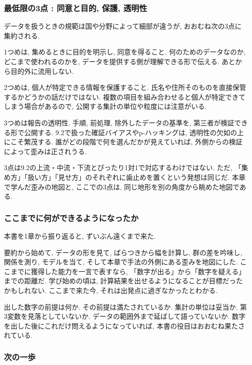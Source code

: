 \subsubsection*{最低限の3点 : 同意と目的, 保護, 透明性}

データを扱うときの規範は国や分野によって細部が違うが, おおむね次の3点に集約される.

1つめは, 集めるときに目的を明示し, 同意を得ること.
何のためのデータなのか, どこまで使われるのかを, データを提供する側が理解できる形で伝える.
あとから目的外に流用しない.

2つめは, 個人が特定できる情報を保護すること.
氏名や住所そのものを直接保管するかどうかの話だけではない.
複数の項目を組み合わせると個人が特定できてしまう場合があるので, 公開する集計の単位や粒度には注意がいる.

3つめは報告の透明性.
手順, 前処理, 除外したデータの基準を, 第三者が検証できる形で公開する.
9.2で扱った確証バイアスやp-ハッキングは, 透明性の欠如の上にこそ繁茂する.
誰がどの段階で何を選んだかが見えていれば, 外側からの検証によって歪みは正されうる.

3点は9.2の上流・中流・下流とぴったり1対1で対応するわけではない. ただ, 「集め方」「扱い方」「見せ方」のそれぞれに歯止めを置くという発想は同じだ.
本章で学んだ歪みの地図と, ここでの3点は, 同じ地形を別の角度から眺めた地図である.

\subsubsection*{ここまでに何ができるようになったか}

本書を1章から振り返ると, ずいぶん遠くまで来た.

要約から始めて, データの形を見て, ばらつきから幅を計算し, 群の差を吟味し, 関係を測り, モデルを当て, そして本章で手法の外側にある歪みを地図にした.
ここまでに獲得した能力を一言で表すなら, 「数字が出る」から「数字を疑える」までの距離だ.
学び始めの頃は, 計算結果を出せるようになることが目標だったかもしれない.
ここまで来た今, それは出発点に過ぎなかったとわかる.

出した数字の前提は何か. その前提は満たされているか. 集計の単位は妥当か. 第3変数を見落としていないか. データの範囲外まで延ばして語っていないか.
数字を出した後にこれだけ問えるようになっていれば, 本書の役目はおおむね果たされている.

\subsubsection*{次の一歩}


